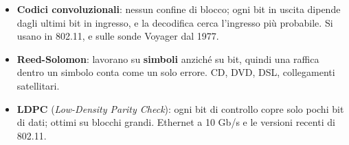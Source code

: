\begin{itemize}
    \item \textbf{Codici convoluzionali}: nessun confine di blocco; ogni bit in uscita dipende dagli ultimi bit in ingresso, e la
          decodifica cerca l'ingresso più probabile. Si usano in 802.11, e sulle sonde Voyager dal 1977.
    \item \textbf{Reed-Solomon}: lavorano su \textbf{simboli} anziché su bit, quindi una raffica dentro un simbolo conta come un solo
          errore. CD, DVD, DSL, collegamenti satellitari.
    \item \textbf{LDPC} (\emph{Low-Density Parity Check}): ogni bit di controllo copre solo pochi bit di dati; ottimi su blocchi grandi.
          Ethernet a 10 Gb/s e le versioni recenti di 802.11.
\end{itemize}


